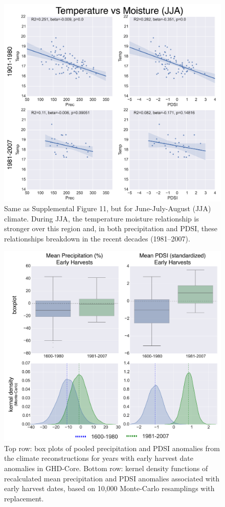 \documentclass[12pt]{article}
\begin{document}
\begin{figure}
\center
\includegraphics[width=1.0\columnwidth,scale=2]{SUPP_fig_14_temp_vs_moist_JJA.png}
\caption{Same as Supplemental Figure 11, but for June-July-August (JJA) climate. During JJA, the temperature moisture relationship is stronger over this region and, in both precipitation and PDSI, these relationships breakdown in the recent decades (1981--2007).}
\end{figure}

\begin{figure}
\center
\includegraphics[width=1.0\columnwidth,scale=2]{SUPP_fig_15_JJA_boxplot_monte.png}
\caption{Top row: box plots of pooled precipitation and PDSI anomalies from the climate reconstructions for years with early harvest date anomalies in GHD-Core. Bottom row: kernel density functions of recalculated mean precipitation and PDSI anomalies associated with early harvest dates, based on 10,000 Monte-Carlo resamplings with replacement.}
\end{figure}
\end{document}
